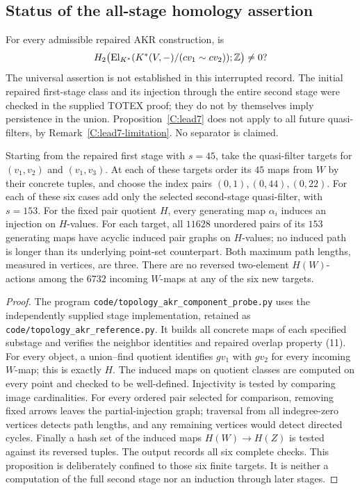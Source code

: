 

\subsection{Status of the all-stage homology assertion}
\begin{unresolved}\label{C:all-stage}
For every admissible repaired AKR construction, is
\[
H_2\bigl(\operatorname{El}_{K^*}(K^*(V,-)/(cv_1\sim cv_2));\mathbb Z\bigr)\ne0?
\]
The universal assertion is not established in this interrupted record.
The initial repaired first-stage class and its injection through the
entire second stage were checked in the supplied TOTEX proof; they do
not by themselves imply persistence in the union. Proposition~\ref{C:lead7}
does not apply to all future quasi-filters, by
Remark~\ref{C:lead7-limitation}. No separator is claimed.
\end{unresolved}

\begin{proposition}
\label{C:component-probe}
Starting from the repaired first stage with $s=45$, take the
quasi-filter targets for $(v_1,v_2)$ and $(v_1,v_3)$. At each of
these targets order its $45$ maps from $W$ by their concrete tuples,
and choose the index pairs $(0,1),(0,44),(0,22)$. For each of these
six cases add only the selected second-stage quasi-filter, with
$s=153$. For the fixed pair quotient $H$, every generating map
$\alpha_i$ induces an injection on $H$-values. For each target,
all $11628$ unordered pairs of its $153$ generating maps have
acyclic induced pair graphs on $H$-values; no induced path is
longer than its underlying point-set counterpart. Both maximum
path lengths, measured in vertices, are three. There are no
reversed two-element $H(W)$-actions among the $6732$ incoming
$W$-maps at any of the six new targets.
\end{proposition}
\begin{proof}
The program \texttt{code/topology\_akr\_component\_probe.py}
uses the independently supplied stage implementation, retained
as \texttt{code/topology\_akr\_reference.py}. It builds all
concrete maps of each specified substage and verifies the
neighbor identities and repaired overlap property (11).
For every object, a union--find quotient identifies $gv_1$
with $gv_2$ for every incoming $W$-map; this is exactly $H$.
The induced maps on quotient classes are computed on every
point and checked to be well-defined. Injectivity is tested
by comparing image cardinalities. For every ordered pair
selected for comparison, removing fixed arrows leaves the
partial-injection graph; traversal from all indegree-zero
vertices detects path lengths, and any remaining vertices
would detect directed cycles. Finally a hash set of the
induced maps $H(W)\to H(Z)$ is tested against its reversed
tuples. The output records all six complete checks.
This proposition is deliberately confined to those six
finite targets. It is neither a computation of the full
second stage nor an induction through later stages.
\end{proof}

